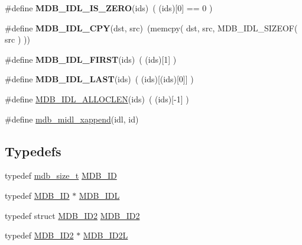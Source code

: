 \begin{DoxyCompactItemize}
\item 
\mbox{\label{group__idls_ga08dc6b24beb65b6539b096451ab6265e}} 
\#define {\bfseries M\+D\+B\+\_\+\+I\+D\+L\+\_\+\+I\+S\+\_\+\+Z\+E\+RO}(ids)~( (ids)\mbox{[}0\mbox{]} == 0 )
\item 
\mbox{\label{group__idls_ga4f2703b101329a054b96b1e7c81b7655}} 
\#define {\bfseries M\+D\+B\+\_\+\+I\+D\+L\+\_\+\+C\+PY}(dst,  src)~(memcpy( dst, src, M\+D\+B\+\_\+\+I\+D\+L\+\_\+\+S\+I\+Z\+E\+OF( src ) ))
\item 
\mbox{\label{group__idls_gacb321970daa0ed047684ebea71be70ac}} 
\#define {\bfseries M\+D\+B\+\_\+\+I\+D\+L\+\_\+\+F\+I\+R\+ST}(ids)~( (ids)\mbox{[}1\mbox{]} )
\item 
\mbox{\label{group__idls_ga1a88b649c8c88811b531dd0e4f336a06}} 
\#define {\bfseries M\+D\+B\+\_\+\+I\+D\+L\+\_\+\+L\+A\+ST}(ids)~( (ids)\mbox{[}(ids)\mbox{[}0\mbox{]}\mbox{]} )
\item 
\#define \mbox{\hyperlink{group__idls_ga4dad2db495180fe6ba5a39fdbf493703}{M\+D\+B\+\_\+\+I\+D\+L\+\_\+\+A\+L\+L\+O\+C\+L\+EN}}(ids)~( (ids)\mbox{[}-\/1\mbox{]} )
\item 
\#define \mbox{\hyperlink{group__idls_gaf1e1ecbabeea10bcf19bd7ab616dcbc1}{mdb\+\_\+midl\+\_\+xappend}}(idl,  id)
\end{DoxyCompactItemize}
\subsection*{Typedefs}
\begin{DoxyCompactItemize}
\item 
typedef \mbox{\hyperlink{lmdb_8h_a78821971e612e3898ef4b3ae45ed86f1}{mdb\+\_\+size\+\_\+t}} \mbox{\hyperlink{group__idls_ga792192229a977c49f083846b5635f92d}{M\+D\+B\+\_\+\+ID}}
\item 
typedef \mbox{\hyperlink{group__idls_ga792192229a977c49f083846b5635f92d}{M\+D\+B\+\_\+\+ID}} $\ast$ \mbox{\hyperlink{group__idls_ga238cc39c422225e05cb3897e641ca9e5}{M\+D\+B\+\_\+\+I\+DL}}
\item 
typedef struct \mbox{\hyperlink{struct_m_d_b___i_d2}{M\+D\+B\+\_\+\+I\+D2}} \mbox{\hyperlink{group__idls_gaf7a69e9dd73fcefb2ed10058331ddac2}{M\+D\+B\+\_\+\+I\+D2}}
\item 
typedef \mbox{\hyperlink{struct_m_d_b___i_d2}{M\+D\+B\+\_\+\+I\+D2}} $\ast$ \mbox{\hyperlink{group__idls_gafcc5d61c06c726db2be5d088dbc68d51}{M\+D\+B\+\_\+\+I\+D2L}}
\end{DoxyCompactItemize}
